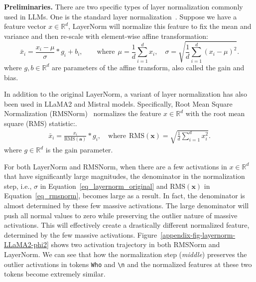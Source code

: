 \documentclass[10pt]{article}
\theoremstyle{definition}
\theoremstyle{plain}
\newcommand{\mbf}[1]{\mathbf{#1}}
\begin{document}
\textbf{Preliminaries.} There are two specific types of layer normalization commonly used in LLMs. One is the standard layer normalization~\citep{ba2016layernorm}. Suppose we have a feature vector $x\in\mathbb{R}^{d}$, LayerNorm will normalize this feature to fix the mean and variance and then re-scale with element-wise affine transformation:
\begin{equation}\label{eq_layernorm_original}
    \bar{x}_{i} = \frac{x_{i}-\mu}{\sigma}*g_{i} + b_{i}, \quad\quad \text{where}~~ \mu = \frac{1}{d}\sum_{i=1}^{d} x_i, \quad \sigma = \sqrt{\frac{1}{d}\sum_{i=1}^{d}(x_i - \mu)^2}.
\end{equation}
where $g,b\in\mathbb{R}^{d}$ are parameters of the affine transform, also called the gain and bias.

In addition to the original LayerNorm, a variant of layer normalization has also been used in LLaMA2 and Mistral models. Specifically, Root Mean Square Normalization (RMSNorm)~\citep{zhang2019rmsnorm} normalizes the feature $x\in\mathbb{R}^{d}$ with the root mean square (RMS) statistic:.
\begin{align}\label{eq_rmsnorm}
 \bar{x}_i = \frac{x_i}{\text{RMS}(\mathbf{a})}* g_i, \quad \text{where}~~ \text{RMS}(\mathbf{x}) = \sqrt{\frac{1}{d} \sum_{i=1}^{d} x_i^2}.
\end{align}
where $g\in\mathbb{R}^{d}$ is the gain parameter.

For both LayerNorm and RMSNorm, when there are a few activations in $x\in\mathbb{R}^{d}$ that have significantly large magnitudes, the denominator in the normalization step, i.e., $\sigma$ in Equation~\ref{eq_layernorm_original} and $\text{RMS}(\mbf{x})$ in Equation~\ref{eq_rmsnorm}, becomes large as a result. In fact, the denominator is almost determined by these few massive activations. The large denominator will push all normal values to zero while preserving the outlier nature of massive activations. This will effectively create a drastically different normalized feature, determined by the few massive activations. 
Figure~\ref{appendix-fig-layernorm-LLaMA2-phi2} shows two activation trajectory in both RMSNorm and LayerNorm. We can see that how the normalization step (\textit{middle}) preserves the outlier activations in tokens \texttt{Who} and \texttt{\textbackslash n} and the normalized features at these two tokens become extremely similar.
\end{document}
